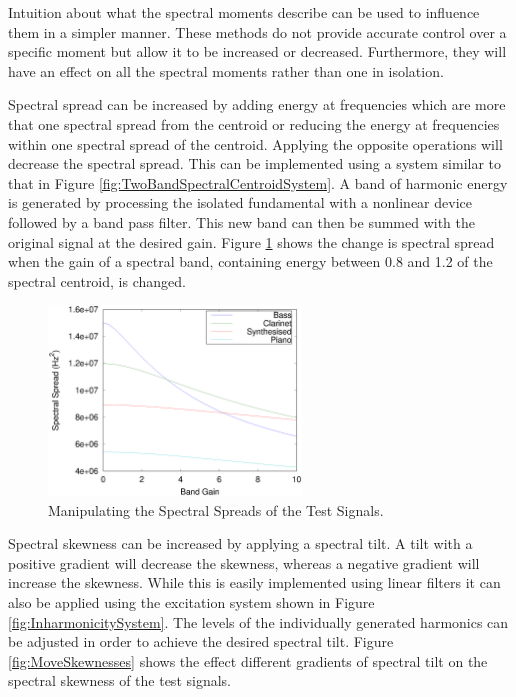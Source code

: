 			Intuition about what the spectral moments describe can be used to influence them in a simpler
			manner. These methods do not provide accurate control over a specific moment but allow it to be
			increased or decreased.  Furthermore, they will have an effect on all the spectral moments rather
			than one in isolation. 
			
			Spectral spread can be increased by adding energy at frequencies which are more that one spectral
			spread from the centroid or reducing the energy at frequencies within one spectral spread of the
			centroid.  Applying the opposite operations will decrease the spectral spread. This can be
			implemented using a system similar to that in Figure \ref{fig:TwoBandSpectralCentroidSystem}. A
			band of harmonic energy is generated by processing the isolated fundamental with a nonlinear device
			followed by a band pass filter. This new band can then be summed with the original signal at the
			desired gain. Figure \ref{fig:MoveSpreads} shows the change is spectral spread when the gain of a
			spectral band, containing energy between 0.8 and 1.2 of the spectral centroid, is changed.

			\begin{figure}[h!]
				\centering
				\includegraphics[width=0.6\textwidth]{chapter6/Images/MoveSpreads.eps}
				\caption{Manipulating the Spectral Spreads of the Test Signals.}
				\label{fig:MoveSpreads}
			\end{figure}


			Spectral skewness can be increased by applying a spectral tilt. A tilt with a positive gradient
			will decrease the skewness, whereas a negative gradient will increase the skewness. While this is
			easily implemented using linear filters it can also be applied using the excitation system shown in
			Figure \ref{fig:InharmonicitySystem}. The levels of the individually generated harmonics can be
			adjusted in order to achieve the desired spectral tilt. Figure \ref{fig:MoveSkewnesses} shows the
			effect different gradients of spectral tilt on the spectral skewness of the test signals.

